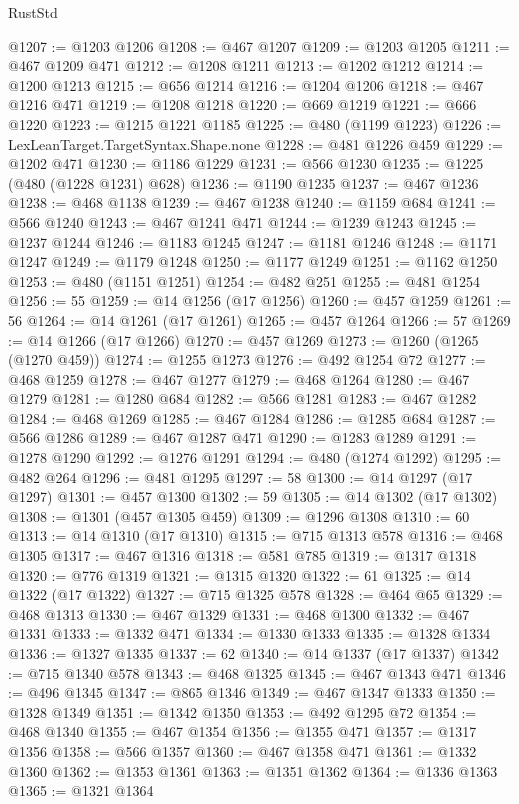 \begin{lexlean}{RustStd}
\begin{coremodule}
{\begin{coremodule}
{{{{{{{{{{{{{{{{{{{{{{{{{{{{{{{{{@1207 := @1203 @1206
@1208 := @467 @1207
@1209 := @1203 @1205
@1211 := @467 @1209 @471
@1212 := @1208 @1211
@1213 := @1202 @1212
@1214 := @1200 @1213
@1215 := @656 @1214
@1216 := @1204 @1206
@1218 := @467 @1216 @471
@1219 := @1208 @1218
@1220 := @669 @1219
@1221 := @666 @1220
@1223 := @1215 @1221 @1185
@1225 := @480 (@1199 @1223)
@1226 := LexLeanTarget.TargetSyntax.Shape.none
@1228 := @481 @1226 @459
@1229 := @1202 @471
@1230 := @1186 @1229
@1231 := @566 @1230
@1235 := @1225 (@480 (@1228 @1231) @628)
@1236 := @1190 @1235
@1237 := @467 @1236
@1238 := @468 @1138
@1239 := @467 @1238
@1240 := @1159 @684
@1241 := @566 @1240
@1243 := @467 @1241 @471
@1244 := @1239 @1243
@1245 := @1237 @1244
@1246 := @1183 @1245
@1247 := @1181 @1246
@1248 := @1171 @1247
@1249 := @1179 @1248
@1250 := @1177 @1249
@1251 := @1162 @1250
@1253 := @480 (@1151 @1251)
@1254 := @482 @251
@1255 := @481 @1254
@1256 := 55
@1259 := @14 @1256 (@17 @1256)
@1260 := @457 @1259
@1261 := 56
@1264 := @14 @1261 (@17 @1261)
@1265 := @457 @1264
@1266 := 57
@1269 := @14 @1266 (@17 @1266)
@1270 := @457 @1269
@1273 := @1260 (@1265 (@1270 @459))
@1274 := @1255 @1273
@1276 := @492 @1254 @72
@1277 := @468 @1259
@1278 := @467 @1277
@1279 := @468 @1264
@1280 := @467 @1279
@1281 := @1280 @684
@1282 := @566 @1281
@1283 := @467 @1282
@1284 := @468 @1269
@1285 := @467 @1284
@1286 := @1285 @684
@1287 := @566 @1286
@1289 := @467 @1287 @471
@1290 := @1283 @1289
@1291 := @1278 @1290
@1292 := @1276 @1291
@1294 := @480 (@1274 @1292)
@1295 := @482 @264
@1296 := @481 @1295
@1297 := 58
@1300 := @14 @1297 (@17 @1297)
@1301 := @457 @1300
@1302 := 59
@1305 := @14 @1302 (@17 @1302)
@1308 := @1301 (@457 @1305 @459)
@1309 := @1296 @1308
@1310 := 60
@1313 := @14 @1310 (@17 @1310)
@1315 := @715 @1313 @578
@1316 := @468 @1305
@1317 := @467 @1316
@1318 := @581 @785
@1319 := @1317 @1318
@1320 := @776 @1319
@1321 := @1315 @1320
@1322 := 61
@1325 := @14 @1322 (@17 @1322)
@1327 := @715 @1325 @578
@1328 := @464 @65
@1329 := @468 @1313
@1330 := @467 @1329
@1331 := @468 @1300
@1332 := @467 @1331
@1333 := @1332 @471
@1334 := @1330 @1333
@1335 := @1328 @1334
@1336 := @1327 @1335
@1337 := 62
@1340 := @14 @1337 (@17 @1337)
@1342 := @715 @1340 @578
@1343 := @468 @1325
@1345 := @467 @1343 @471
@1346 := @496 @1345
@1347 := @865 @1346
@1349 := @467 @1347 @1333
@1350 := @1328 @1349
@1351 := @1342 @1350
@1353 := @492 @1295 @72
@1354 := @468 @1340
@1355 := @467 @1354
@1356 := @1355 @471
@1357 := @1317 @1356
@1358 := @566 @1357
@1360 := @467 @1358 @471
@1361 := @1332 @1360
@1362 := @1353 @1361
@1363 := @1351 @1362
@1364 := @1336 @1363
@1365 := @1321 @1364
}}}}}}}}}}}}}}}}}}}}}}}}}}}}}}}}}
\end{coremodule}}
\end{coremodule}
\end{lexlean}
